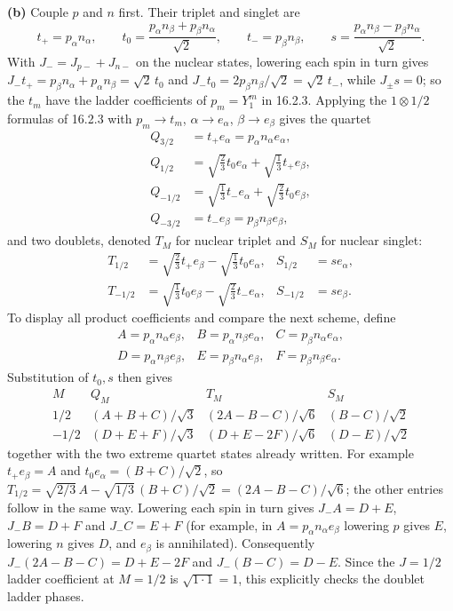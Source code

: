 \textbf{(b)} Couple $p$ and $n$ first. Their triplet and singlet are
\[
t_+=p_\alpha n_\alpha,\qquad
t_0=\frac{p_\alpha n_\beta+p_\beta n_\alpha}{\sqrt2},\qquad
t_-=p_\beta n_\beta,\qquad
s=\frac{p_\alpha n_\beta-p_\beta n_\alpha}{\sqrt2}.
\]
With $J_-=J_{p-}+J_{n-}$ on the nuclear states, lowering each spin in
turn gives $J_-t_+=p_\beta n_\alpha+p_\alpha n_\beta=\sqrt2\,t_0$ and
$J_-t_0=2p_\beta n_\beta/\sqrt2=\sqrt2\,t_-$, while $J_\pm s=0$; so
the $t_m$ have the ladder coefficients of $p_m=Y_1^m$ in 16.2.3.
Applying the $1\otimes1/2$ formulas of 16.2.3 with $p_m\to t_m$,
$\alpha\to e_\alpha$, $\beta\to e_\beta$ gives the quartet
\[
\begin{aligned}
Q_{3/2}&=t_+e_\alpha=p_\alpha n_\alpha e_\alpha,\\
Q_{1/2}&=\sqrt{\tfrac23}t_0e_\alpha+\sqrt{\tfrac13}t_+e_\beta,\\
Q_{-1/2}&=\sqrt{\tfrac13}t_-e_\alpha+\sqrt{\tfrac23}t_0e_\beta,\\
Q_{-3/2}&=t_-e_\beta=p_\beta n_\beta e_\beta,
\end{aligned}
\]
and two doublets, denoted $T_M$ for nuclear triplet and $S_M$ for
nuclear singlet:
\[
\begin{aligned}
T_{1/2}&=\sqrt{\tfrac23}t_+e_\beta-\sqrt{\tfrac13}t_0e_\alpha,&
S_{1/2}&=s e_\alpha,\\
T_{-1/2}&=\sqrt{\tfrac13}t_0e_\beta-\sqrt{\tfrac23}t_-e_\alpha,&
S_{-1/2}&=s e_\beta.
\end{aligned}
\]
To display all product coefficients and compare the next scheme, define
\[
\begin{array}{lll}
A=p_\alpha n_\alpha e_\beta,&
B=p_\alpha n_\beta e_\alpha,&
C=p_\beta n_\alpha e_\alpha,\\
D=p_\alpha n_\beta e_\beta,&
E=p_\beta n_\alpha e_\beta,&
F=p_\beta n_\beta e_\alpha.
\end{array}
\]
Substitution of $t_0,s$ then gives
\[
\begin{array}{c|ccc}
M&Q_M&T_M&S_M\\ \hline
1/2&(A+B+C)/\sqrt3&(2A-B-C)/\sqrt6&(B-C)/\sqrt2\\
-1/2&(D+E+F)/\sqrt3&(D+E-2F)/\sqrt6&(D-E)/\sqrt2
\end{array}
\]
together with the two extreme quartet states already written.
For example $t_+e_\beta=A$ and $t_0e_\alpha=(B+C)/\sqrt2$, so
$T_{1/2}=\sqrt{2/3}\,A-\sqrt{1/3}\,(B+C)/\sqrt2=(2A-B-C)/\sqrt6$;
the other entries follow in the same way.
Lowering each spin in turn gives $J_-A=D+E$, $J_-B=D+F$ and
$J_-C=E+F$ (for example, in $A=p_\alpha n_\alpha e_\beta$ lowering
$p$ gives $E$, lowering $n$ gives $D$, and $e_\beta$ is annihilated).
Consequently $J_-(2A-B-C)=D+E-2F$ and
$J_-(B-C)=D-E$. Since the $J=1/2$ ladder coefficient at $M=1/2$ is
$\sqrt{1\cdot1}=1$, this explicitly checks the doublet ladder phases.

